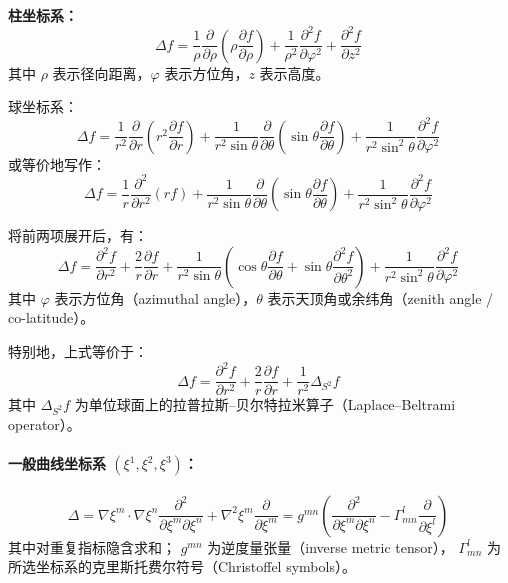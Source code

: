 \textbf{柱坐标系：}
\[
\Delta f
= \frac{1}{\rho}
  \frac{\partial}{\partial \rho}
  \left( \rho \frac{\partial f}{\partial \rho} \right)
+ \frac{1}{\rho^{2}}
  \frac{\partial^{2} f}{\partial \varphi^{2}}
+ \frac{\partial^{2} f}{\partial z^{2}}~
\]
其中 $\rho$ 表示径向距离，$\varphi$ 表示方位角，$z$ 表示高度。

球坐标系：
\[
\Delta f
= \frac{1}{r^{2}}
  \frac{\partial}{\partial r}
  \left( r^{2} \frac{\partial f}{\partial r} \right)
+ \frac{1}{r^{2} \sin \theta}
  \frac{\partial}{\partial \theta}
  \left( \sin \theta \frac{\partial f}{\partial \theta} \right)
+ \frac{1}{r^{2} \sin^{2} \theta}
  \frac{\partial^{2} f}{\partial \varphi^{2}}~
\]
或等价地写作：
\[
\Delta f
= \frac{1}{r} \frac{\partial^{2}}{\partial r^{2}}(r f)
+ \frac{1}{r^{2} \sin \theta}
  \frac{\partial}{\partial \theta}
  \left( \sin \theta \frac{\partial f}{\partial \theta} \right)
+ \frac{1}{r^{2} \sin^{2} \theta}
  \frac{\partial^{2} f}{\partial \varphi^{2}}~
\]

将前两项展开后，有：
\[
\Delta f
= \frac{\partial^{2} f}{\partial r^{2}}
+ \frac{2}{r} \frac{\partial f}{\partial r}
+ \frac{1}{r^{2} \sin \theta}
  \left( \cos \theta \frac{\partial f}{\partial \theta}
       + \sin \theta \frac{\partial^{2} f}{\partial \theta^{2}} \right)
+ \frac{1}{r^{2} \sin^{2} \theta}
  \frac{\partial^{2} f}{\partial \varphi^{2}}~
\]
其中 $\varphi$ 表示方位角（azimuthal angle），$\theta$ 表示天顶角或余纬角（zenith angle / co-latitude）。

特别地，上式等价于：
\[
\Delta f
= \frac{\partial^{2} f}{\partial r^{2}}
+ \frac{2}{r} \frac{\partial f}{\partial r}
+ \frac{1}{r^{2}} \Delta_{S^{2}} f~
\]
其中 $\Delta_{S^{2}} f$ 为单位球面上的拉普拉斯–贝尔特拉米算子（Laplace–Beltrami operator）。

\paragraph{一般曲线坐标系 $(\xi^{1}, \xi^{2}, \xi^{3})$：}
\[
\Delta
= \nabla \xi^{m} \cdot \nabla \xi^{n}
  \frac{\partial^{2}}{\partial \xi^{m} \partial \xi^{n}}
+ \nabla^{2} \xi^{m}
  \frac{\partial}{\partial \xi^{m}}
= g^{mn} \left(
  \frac{\partial^{2}}{\partial \xi^{m} \partial \xi^{n}}
  - \Gamma^{l}_{mn}
    \frac{\partial}{\partial \xi^{l}}
\right)~
\]
其中对重复指标隐含求和；
$g^{mn}$ 为逆度量张量（inverse metric tensor），
$\Gamma^{l}_{mn}$ 为所选坐标系的克里斯托费尔符号（Christoffel symbols）。

